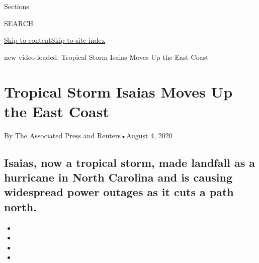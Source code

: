 Sections

SEARCH

\protect\hyperlink{site-content}{Skip to
content}\protect\hyperlink{site-index}{Skip to site index}

new video loaded: Tropical Storm Isaias Moves Up the East Coast

\hypertarget{tropical-storm-isaias-moves-up-the-east-coast}{%
\section{Tropical Storm Isaias Moves Up the East
Coast}\label{tropical-storm-isaias-moves-up-the-east-coast}}

By The Associated Press and Reuters•August 4, 2020

\hypertarget{isaias-now-a-tropical-storm-made-landfall-as-a-hurricane-in-north-carolina-and-is-causing-widespread-power-outages-as-it-cuts-a-path-north}{%
\subsection{Isaias, now a tropical storm, made landfall as a hurricane
in North Carolina and is causing widespread power outages as it cuts a
path
north.}\label{isaias-now-a-tropical-storm-made-landfall-as-a-hurricane-in-north-carolina-and-is-causing-widespread-power-outages-as-it-cuts-a-path-north}}

\begin{itemize}
\item
\item
\item
\item
\end{itemize}

